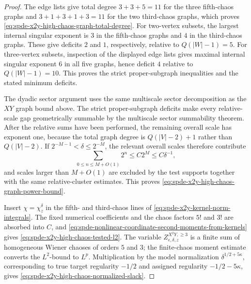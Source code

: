 \begin{proof}
The edge lists give total degree \(3+3+5=11\) for the three fifth-chaos
graphs and \(3+1+3+1+3=11\) for the two third-chaos graphs, which proves
\eqref{eq:spde-x2y-high-chaos-graph-total-degree}.  For two-vertex subsets,
the largest internal singular exponent is \(3\) in the fifth-chaos graphs and
\(4\) in the third-chaos graphs.  These give deficits \(2\) and \(1\),
respectively, relative to \(Q(|W|-1)=5\).  For three-vertex subsets,
inspection of the displayed edge lists gives maximal internal singular
exponent \(6\) in all five graphs, hence deficit \(4\) relative to
\(Q(|W|-1)=10\).  This proves the strict proper-subgraph inequalities and the
stated minimum deficits.

The dyadic sector argument uses the same multiscale sector decomposition as
the \(XY\) graph bound above.  The strict proper-subgraph deficits make every
relative-scale gap geometrically summable by the multiscale sector
summability theorem.  After the relative sums have been performed, the
remaining overall scale has exponent one, because the total graph degree is
\(Q(|V|-2)+1\) rather than \(Q(|V|-2)\).  If
\(2^{-M-1}<\delta\leq2^{-M}\), the relevant overall scales therefore
contribute
\[
  \sum_{0\leq n\leq M+O(1)}2^n\leq C2^M\leq C\delta^{-1},
\]
and scales larger than \(M+O(1)\) are excluded by the test supports together
with the same relative-cluster estimates.  This proves
\eqref{eq:spde-x2y-high-chaos-graph-power-bound}.

Insert \(\chi=\chi_z^\delta\) in the fifth- and third-chaos lines of
\eqref{eq:spde-x2y-kernel-norm-integrals}.  The fixed numerical coefficients
and the chaos factors \(5!\) and \(3!\) are absorbed into \(C\), and
\eqref{eq:spde-nonlinear-coordinate-second-moments-from-kernels} gives
\eqref{eq:spde-x2y-high-chaos-tested-l2}.  The variable
\(Z_{\epsilon,\delta,z}^{X^2Y,\geq3}\) is a finite sum of homogeneous Wiener
chaoses of orders \(5\) and \(3\); the finite-chaos moment estimate converts
the \(L^2\)-bound to \(L^p\).  Multiplication by the model normalization
\(\delta^{1/2+5\kappa}\), corresponding to true target regularity
\(-1/2\) and assigned regularity \(-1/2-5\kappa\), gives
\eqref{eq:spde-x2y-high-chaos-normalized-slack}.
\end{proof}

